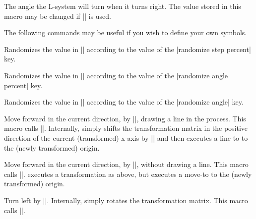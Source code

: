 \begin{command}{\pgfdeclarelindenmayersystem{}}
\begin{command}{\symbol{}}
\begin{command}{\pgflsystemcurrentrightangle}
	The angle the L-system will turn when it turns right.
	The value stored in this macro may be changed if
	|\pgflsystemrandomizerightangle| is used.
\end{command}


The following commands may be useful if you wish to define your own
symbols.

\begin{command}{\pgflsystemrandomizestep}
	Randomizes the value in |\pgflsystemcurrentstep| according to the
	value of the |randomize step percent| key.
\end{command}

\begin{command}{\pgflsystemrandomizeleftangle}
	Randomizes the value in |\pgflsystemcurrentleftangle| according to
	the value of the |randomize angle percent| key.
\end{command}

\begin{command}{\pgflsystemrandomizerightangle}
	Randomizes the value in |\pgflsystemcurrentrightangle| according
	to the value of	the |randomize angle| key.
\end{command}

\begin{command}{\pgflsystemdrawforward}
	Move forward in the current direction, by |\pgflsystemcurrentstep|,
	drawing a line in the process. This macro calls
	|\pgflsystemrandomizestep|. Internally, \pgfname{} simply
	shifts the transformation matrix in the positive direction of
	the current (transformed) x-axis by |\pgflsystemstep|
	and then executes a line-to to the (newly transformed) origin.
\end{command}

\begin{command}{\pgflsystemmoveforward}
	Move forward in the current direction, by |\pgflsystemcurrentstep|,
	without drawing a line. This macro calls
	|\pgflsystemrandomizestep|. \pgfname{} executes a transformation
	as above, but executes a move-to to the (newly transformed)
	origin.
\end{command}

\begin{command}{\pgflsystemturnleft}
  Turn left by |\pgflsystemcurrentleftangle|. Internally, \pgfname{}
	simply rotates the transformation matrix. This macro calls
	|\pgflsystemrandomizeleftangle|.
\end{command}


\end{command}
\end{command}
